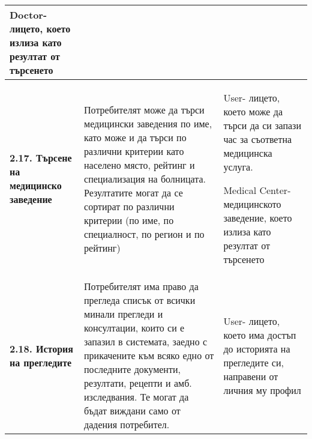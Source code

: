 \documentclass[a4paper,12pt]{article}
\begin{document}
\begin{xltabular}{\textwidth}{|p{4cm}|p{6cm}|p{6cm}|}
Doctor- лицето, което излиза като резултат от търсенето \\
\hline
{}\textbf{2.17. Търсене на медицинско заведение} &
Потребителят може да търси медицински заведения по име, като може и да търси по различни критерии като населено място, рейтинг и специализация на болницата. Резултатите могат да се сортират по различни критерии (по име, по специалност, по регион и по рейтинг) &
User- лицето, което може да търси да си запази час за съответна медицинска услуга.

Medical Center- медицинското заведение, което излиза като резултат от търсенето \\
\hline
{}\textbf{2.18. История на прегледите} &
Потребителят има право да прегледа списък от всички минали прегледи и консултации, които си е запазил в системата, заедно с прикачените към всяко едно от последните документи, резултати, рецепти и амб. изследвания. Те могат да бъдат виждани само от дадения потребител. &
User- лицето, което има достъп до историята на прегледите си, направени от личния му профил \\
\hline
\end{xltabular}
\end{document}
